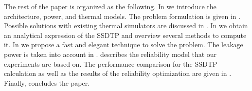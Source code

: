 The rest of the paper is organized as the following. In  we introduce the architecture, power, and thermal models. The problem formulation is given in . Possible solutions with existing thermal simulators are discussed in . In  we obtain an analytical expression of the SSDTP and overview several methods to compute it. In  we propose a fast and elegant technique to solve the problem. The leakage power is taken into account in .  describes the reliability model that our experiments are based on. The performance comparison for the SSDTP calculation as well as the results of the reliability optimization are given in . Finally,  concludes the paper.
